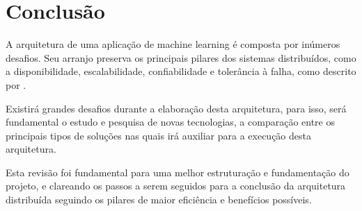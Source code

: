 \chapter{\textbf{Conclusão}} %
A arquitetura de uma aplicação de machine learning é composta por inúmeros desafios. Seu arranjo preserva os principais pilares dos sistemas distribuídos, como a disponibilidade, escalabilidade, confiabilidade e tolerância à falha, como descrito por \cite{vanSteen2016}. \par
Existirá grandes desafios durante a elaboração desta arquitetura, para isso, será fundamental o estudo e pesquisa de novas tecnologias, a comparação entre os principais tipos de soluções  nas quais irá auxiliar para a execução desta arquitetura.\par
Esta revisão foi fundamental para uma melhor estruturação e fundamentação  do projeto, e clareando os passos a serem seguidos para a conclusão da arquitetura distribuída seguindo os pilares de maior eficiência e benefícios possíveis.
